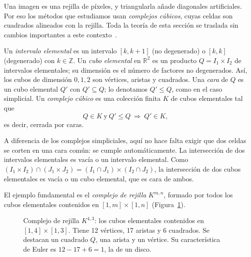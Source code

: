 Una imagen es una rejilla de píxeles, y triangularla añade diagonales
artificiales. Por eso los métodos que estudiamos usan \emph{complejos
cúbicos}, cuyas celdas son cuadrados alineados con la rejilla. Toda la
teoría de esta sección se traslada sin cambios importantes a este
contexto~\cite{kaczynski2004}.

\begin{definicion}
Un \emph{intervalo elemental} es un intervalo $[k,k+1]$ (no degenerado) o
$[k,k]$ (degenerado) con $k\in\mathbb{Z}$. Un \emph{cubo elemental} en
$\mathbb{R}^2$ es un producto $Q=I_1\times I_2$ de intervalos elementales;
su dimensión es el número de factores no degenerados. Así, los cubos de
dimensión $0,1,2$ son vértices, aristas y cuadrados. Una \emph{cara} de $Q$
es un cubo elemental $Q'$ con $Q'\subseteq Q$; lo denotamos $Q'\le Q$, como
en el caso simplicial. Un \emph{complejo cúbico} es una colección finita $K$
de cubos elementales tal que
\[
  Q\in K\ \text{y}\ Q'\le Q\ \Longrightarrow\ Q'\in K,
\]
es decir, cerrada por caras.
\end{definicion}

\begin{observacion}
A diferencia de los complejos simpliciales, aquí no hace falta exigir que
dos celdas se corten en una cara común: se cumple automáticamente. La
intersección de dos intervalos elementales es vacía o un intervalo
elemental. Como $(I_1\times I_2)\cap(J_1\times J_2)=(I_1\cap J_1)\times(I_2\cap J_2)$,
la intersección de dos cubos elementales es vacía o un cubo elemental, que
es cara de ambos.
\end{observacion}

El ejemplo fundamental es el \emph{complejo de rejilla}
$K^{m,n}$, formado por todos los cubos elementales contenidos en
$[1,m]\times[1,n]$ (Figura~\ref{fig:rejilla}).

\begin{figure}[ht]
\centering
{}
\caption{Complejo de rejilla $K^{4,3}$: los cubos elementales contenidos en
$[1,4]\times[1,3]$. Tiene 12 vértices, 17 aristas y 6 cuadrados. Se
destacan un cuadrado $Q$, una arista y un vértice. Su característica de
Euler es $12-17+6=1$, la de un disco.}
\label{fig:rejilla}
\end{figure}

